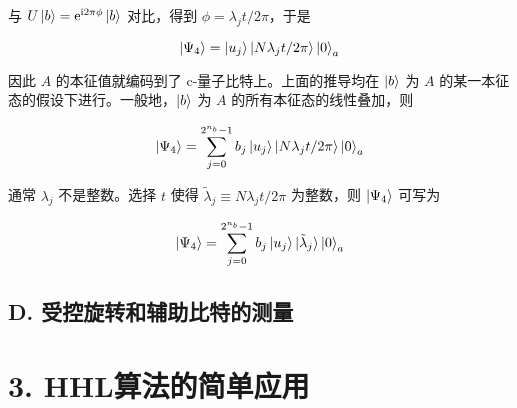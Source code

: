 \documentclass[aps,prl,twocolumn,groupedaddress]{revtex4-2}
\begin{document}
与 $U\ket{b}=\mathrm{e}^{\mathrm{i}2\pi \phi}\ket{b}$ 对比，得到 $\phi=\lambda_j t/2\pi$，于是

$$
\ket{\Psi_4}
=\ket{u_j} \ket{N\lambda_j t/2\pi}\ket{0}_a
$$

因此 $A$ 的本征值就编码到了 c-量子比特上。上面的推导均在 $\ket{b}$ 为 $A$ 的某一本征态的假设下进行。一般地，$\ket{b}$ 为 $A$ 的所有本征态的线性叠加，则

$$
\ket{\Psi_4}
=\sum_{j=0}^{2^{n_b}-1} b_j\ket{u_j}\ket{N\lambda_j t/2\pi} \ket{0}_a
$$

通常 $\lambda_j$ 不是整数。选择 $t$ 使得 $\tilde{\lambda}_j\equiv N\lambda_j t/2\pi$ 为整数，则 $\ket{\Psi_4} $ 可写为

$$
\ket{\Psi_4}
=\sum_{j=0}^{2^{n_b}-1} b_j \ket{u_j} \ket{\tilde{\lambda}_j}\ket{0}_a
$$

\subsection{D. 受控旋转和辅助比特的测量}



\section{3. HHL算法的简单应用}


%


\end{document}
